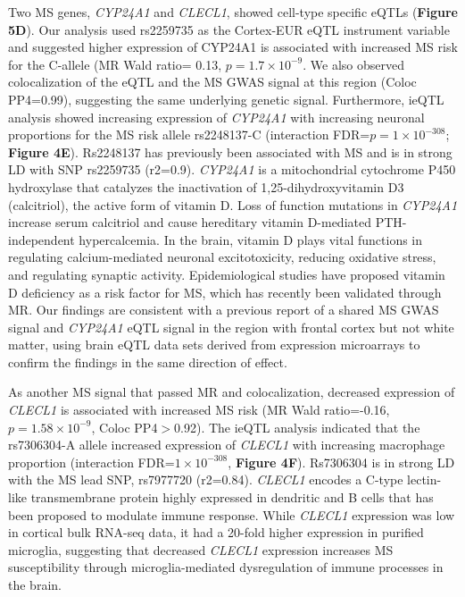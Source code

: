 Two MS genes, \emph{CYP24A1} and \emph{CLECL1}, showed cell-type specific eQTLs (\textbf{Figure 5D}). Our analysis used rs2259735 as the Cortex-EUR eQTL instrument variable and suggested higher expression of CYP24A1 is associated with increased MS risk for the C-allele (MR Wald ratio= 0.13, $p=1.7 \times 10^{-9}$. We also observed colocalization of the eQTL and the MS GWAS signal at this region (Coloc PP4=0.99), suggesting the same underlying genetic signal. Furthermore, ieQTL analysis showed increasing expression of \emph{CYP24A1} with increasing neuronal proportions for the MS risk allele rs2248137-C (interaction FDR=$p=1 \times 10^{-308}$; \textbf{Figure 4E}). Rs2248137 has previously been associated with MS\cite{consortiumMultipleSclerosisGenomic2019} and is in strong LD with SNP rs2259735 (r2=0.9). \emph{CYP24A1} is a mitochondrial cytochrome P450 hydroxylase that catalyzes the inactivation of 1,25-dihydroxyvitamin D3 (calcitriol), the active form of vitamin D\cite{jones25HydroxyvitaminD24hydroxylaseCYP24A12012}. Loss of function mutations in \emph{CYP24A1} increase serum calcitriol and cause hereditary vitamin D-mediated PTH-independent hypercalcemia\cite{schlingmannMutationsCYP24A1Idiopathic2011,cappellaniHereditaryHypercalcemiaCaused2019}. In the brain, vitamin D plays vital functions in regulating calcium-mediated neuronal excitotoxicity, reducing oxidative stress, and regulating synaptic activity\cite{mpandzouVitaminDeficiencyIts2016}. Epidemiological studies have proposed vitamin D deficiency as a risk factor for MS\cite{agnelloCYP27A1CYP24A1RXRalpha2018,pierrot-deseillignyHypovitaminosisOneEnvironmental2010}, which has recently been validated through MR\cite{rheadMendelianRandomizationShows2016,jacobsBMILowVitamin2020,jiangCausalRoleCirculating2021}.  Our findings are consistent with a previous report of a shared MS GWAS signal and \emph{CYP24A1} eQTL signal in the region with frontal cortex but not white matter, using brain eQTL data sets derived from expression microarrays to confirm the findings in the same direction of effect\cite{ramasamyGeneticEvidencePathogenic2014}.  

As another MS signal that passed MR and colocalization, decreased expression of \emph{CLECL1} is associated with increased MS risk (MR Wald ratio=-0.16, $p=1.58 \times 10^{-9}$, Coloc PP4$>$0.92). The ieQTL analysis indicated that the rs7306304-A allele increased expression of \emph{CLECL1} with increasing macrophage proportion (interaction FDR=$1 \times 10^{-308}$, \textbf{Figure 4F}). Rs7306304 is in strong LD with the MS lead SNP, rs7977720 (r2=0.84)\cite{consortiumMultipleSclerosisGenomic2019}. \emph{CLECL1} encodes a C-type lectin-like transmembrane protein highly expressed in dendritic and B cells that has been proposed to modulate immune response\cite{vanluijnMultipleSclerosisassociatedCLEC16A2015}. While \emph{CLECL1} expression was low in cortical bulk RNA-seq data, it had a 20-fold higher expression in purified microglia\cite{consortiumMultipleSclerosisGenomic2019}, suggesting that decreased \emph{CLECL1} expression increases MS susceptibility through microglia-mediated dysregulation of immune processes in the brain. 

